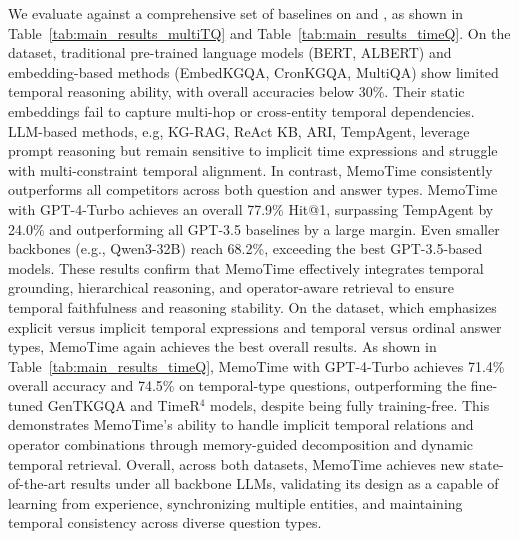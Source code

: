 We evaluate \mot against a comprehensive set of baselines on 
 and , as shown in Table~\ref{tab:main_results_multiTQ} and Table~\ref{tab:main_results_timeQ}. 
% 
On the  dataset, traditional pre-trained language models (BERT, ALBERT) and embedding-based methods (EmbedKGQA, CronKGQA, MultiQA) show limited temporal reasoning ability, with overall accuracies below 30\%.  
Their static embeddings fail to capture multi-hop or cross-entity temporal dependencies.  
LLM-based methods, e.g, KG-RAG, ReAct KB, ARI, TempAgent, leverage prompt reasoning but remain sensitive to implicit time expressions and struggle with multi-constraint temporal alignment.  
In contrast, MemoTime consistently outperforms all competitors across both question and answer types.  
MemoTime with GPT-4-Turbo achieves an overall 77.9\% Hit@1, surpassing TempAgent by 24.0\% and outperforming all GPT-3.5 baselines by a large margin.  
Even smaller backbones (e.g., Qwen3-32B) reach 68.2\%, exceeding the best GPT-3.5-based models.  
These results confirm that MemoTime effectively integrates temporal grounding, hierarchical reasoning, and operator-aware retrieval to ensure temporal faithfulness and reasoning stability.
On the  dataset, which emphasizes explicit versus implicit temporal expressions and temporal versus ordinal answer types, MemoTime again achieves the best overall results.  
As shown in Table~\ref{tab:main_results_timeQ}, MemoTime with GPT-4-Turbo achieves 71.4\% overall accuracy and 74.5\% on temporal-type questions, outperforming the fine-tuned GenTKGQA and TimeR$^4$ models, despite being fully training-free.  
This demonstrates MemoTime’s ability to handle implicit temporal relations and operator combinations through memory-guided decomposition and dynamic temporal retrieval.  
Overall, across both datasets, MemoTime achieves new state-of-the-art results under all backbone LLMs, validating its design as a  capable of learning from experience, synchronizing multiple entities, and maintaining temporal consistency across diverse question types.


\vspace{-2mm}



